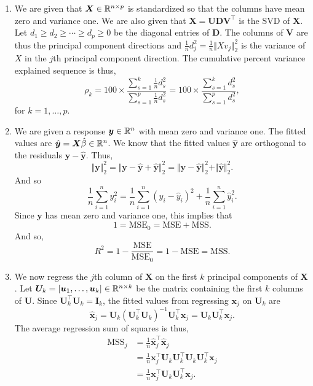\begin{enumerate}[label=(\alph*)]
    \item We are given that $\bm{X} \in \mathbb{R}^{n \times p}$  is standardized so that the columns have mean zero and variance one. We are also given that $\bm{X} = \bm{UDV}^\top$ is the SVD of $\bm{X}$. Let $d_1 \ge d_2 \ge \cdots \ge d_p \ge 0$ be the diagonal entries of $\bm{D}$. The columns of $\bm{V}$ are thus the principal component directions and $\frac{1}{n} d_j^2 = \frac{1}{n}\Vert Xv_j \Vert_2^2$ is the variance of $X$ in the $j$th principal component direction. The cumulative percent variance explained sequence is thus,
    \[\rho_k = 100 \times \frac{\sum_{s=1}^k \frac{1}{n}d_s^2}{\sum_{s=1}^p \frac{1}{n}d_s^2}  =100 \times \frac{\sum_{s=1}^k d_s^2}{\sum_{s=1}^p d_s^2} ,\]
    for $k=1,\ldots,p$.
    \item We are given a response $\bm{y} \in \mathbb{R}^n$ with mean zero and variance one. The fitted values are $\hat{\bm{y}}=\bm{X}\hat{\beta} \in \mathbb{R}^n$. We know that the fitted values $\hat{\bm{y}}$ are orthogonal to the residuals $\bm{y}-\hat{\bm{y}}$. Thus,
    \[\Vert \bm{y} \Vert_2^2 = \Vert \bm{y}-\hat{\bm{y}} + \hat{\bm{y}} \Vert_2^2 =\Vert \bm{y}-\hat{\bm{y}}\Vert_2^2 + \Vert \hat{\bm{y}} \Vert_2^2.  \]
    And so
    \[\frac{1}{n}\sum_{i=1}^n y_i^2 = \frac{1}{n}\sum_{i=1}^n(y_i-\hat{y}_i)^2 + \frac{1}{n}\sum_{i=1}^n \hat{y}_i^2. \]
    Since $\bm{y}$ has mean zero and variance one, this implies that
    \[1 = \mathrm{MSE}_0 = \mathrm{MSE} + \mathrm{MSS}. \]
    And so,
    \[R^2 = 1-\frac{\mathrm{MSE}}{\mathrm{MSE}_0} = 1-\mathrm{MSE} = \mathrm{MSS}. \]
    \item  We now regress the $j$th column of $\bm{X}$ on the first $k$ principal components of $\bm{X}$. Let $\bm{U}_k = [\bm{u}_1,\ldots,\bm{u}_k] \in \mathbb{R}^{n \times k}$ be the matrix containing the first $k$ columns of $\bm{U}$. Since $\bm{U}_k^\top \bm{U}_k = \bm{I}_k$, the fitted values from regressing $\bm{x}_j$ on $\bm{U}_k$ are
    \[\hat{\bm{x}}_j = \bm{U}_k(\bm{U}_k^\top \bm{U}_k)^{-1}\bm{U}_k^\top \bm{x}_j =  \bm{U}_k\bm{U}_k^\top \bm{x}_j.\]
    The average regression sum of squares is thus,
    \begin{align*}
        \mathrm{MSS}_j &=\frac{1}{n} \hat{\bm{x}}_j^\top \hat{\bm{x}}_j\\
        &=\frac{1}{n} \bm{x}_j^\top \bm{U}_k\bm{U}_k^\top \bm{U}_k \bm{U}_k^\top \bm{x}_j\\
        &=\frac{1}{n}\bm{x}_j^\top \bm{U}_k\bm{U}_k^\top \bm{x}_j.
    \end{align*}

\end{enumerate}
